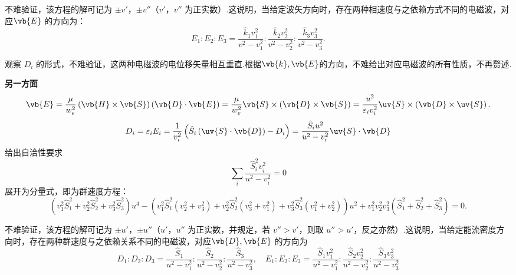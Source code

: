 不难验证，该方程的解可记为 \(\pm v'\)，\(\pm v''\)（\(v'\)，\(v''\) 为正实数）.这说明，当给定波矢方向时，存在两种相速度与之依赖方式不同的电磁波，对应\(\vb{E}\) 的方向为：
\begin{equation*}
	E_1 : E_2 : E_3 = \dfrac{\hat{k}_1 v_1^2}{v^2 - v_1^2} : \dfrac{\hat{k}_2 v_2^2}{v^2 - v_2^2} : \dfrac{\hat{k}_3 v_3^2}{v^2 - v_3^2}.
\end{equation*}

观察 \(D_i\) 的形式，不难验证，这两种电磁波的电位移矢量相互垂直.根据\(\vb{k},\vb{E}\)的方向，不难给出对应电磁波的所有性质，不再赘述.

\textbf{另一方面}
\begin{equation*}
	\vb{E} = \dfrac{\mu}{w_e^2} \left( \vb{H} \times \vb{S} \right) \left( \vb{D} \cdot \vb{E} \right) = \dfrac{\mu}{w_e^2} \vb{S} \times \left( \vb{D} \times \vb{S} \right) = \dfrac{u^2}{\varepsilon_i v_i^2} \uv{S} \times \left( \vb{D} \times \uv{S} \right).
\end{equation*}
\begin{equation*}
	D_i = \varepsilon_i E_i = \dfrac{1}{v_i^2 }\left(\hat{S}_i\left(\uv{S}\cdot\vb{D}\right)-D_i\right)= \dfrac{\hat{S}_i u^2}{u^2 - v_i^2} \uv{S} \cdot \vb{D}
\end{equation*}
给出自洽性要求
\begin{equation*}
	\sum_i \dfrac{\hat{S}_i^2 v_i^2}{u^2 - v_i^2} = 0
\end{equation*}
展开为分量式，即为群速度方程：
\begin{equation*}
	\left( v_1^2 \hat{S}_1^2 + v_2^2 \hat{S}_2^2 + v_3^2 \hat{S}_3^2 \right) u^4 - \left( v_1^2 \hat{S}_1^2 \left(v_2^2 + v_3^2\right) + v_2^2 \hat{S}_2^2 \left(v_3^2 + v_1^2\right) + v_3^2 \hat{S}_3^2 \left(v_1^2 + v_2^2\right) \right) u^2 + v_1^2 v_2^2 v_3^2 \left( \hat{S}_1^2 + \hat{S}_2^2 + \hat{S}_3^2 \right) = 0.
\end{equation*}

不难验证，该方程的解可记为 \(\pm u'\)，\(\pm u''\)（\(u'\)，\(u''\) 为正实数，并规定，若 \(v'' > v'\)，则取 \(u'' > u'\)，反之亦然）.这说明，当给定能流密度方向时，存在两种群速度与之依赖关系不同的电磁波，对应\(\vb{D},\vb{E}\) 的方向为
\begin{equation*}
	D_1 : D_2 : D_3 = \dfrac{\hat{S}_1}{u^2 - v_1^2} : \dfrac{\hat{S}_2}{u^2 - v_2^2} : \dfrac{\hat{S}_3}{u^2 - v_3^2},\quad E_1 : E_2 : E_3 = \dfrac{\hat{S}_1 v_1^2}{u^2 - v_1^2} : \dfrac{\hat{S}_2 v_2^2}{u^2 - v_2^2} : \dfrac{\hat{S}_3 v_3^2}{u^2 - v_3^2}
\end{equation*}

